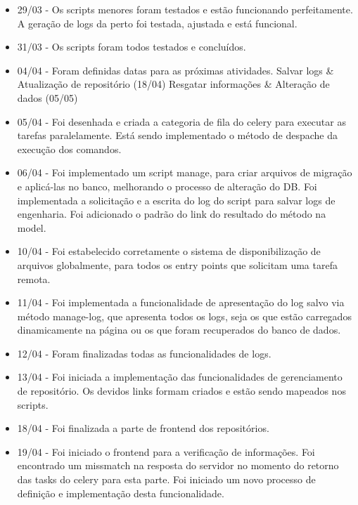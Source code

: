 \begin{itemize}
    \item 29/03 -
Os scripts menores foram testados e estão funcionando perfeitamente. A geração de logs da perto foi testada, ajustada e está funcional.


    \item 31/03 -
Os scripts foram todos testados e concluídos.


    \item 04/04 -
Foram definidas datas para as próximas atividades.
Salvar logs \& Atualização de repositório (18/04)
Resgatar informações \& Alteração de dados (05/05)


    \item 05/04 -
Foi desenhada e criada a categoria de fila do celery para executar as tarefas paralelamente. Está sendo implementado o método de despache da execução dos comandos.


    \item 06/04 -
Foi implementado um script manage, para criar arquivos de migração e aplicá-las no banco, melhorando o processo de alteração do DB.
Foi implementada a solicitação e a escrita do log do script para salvar logs de engenharia.
Foi adicionado o padrão do link do resultado do método na model.


    \item 10/04 -
Foi estabelecido corretamente o sistema de disponibilização de arquivos globalmente, para todos os entry points que solicitam uma tarefa remota.


    \item 11/04 -
Foi implementada a funcionalidade de apresentação do log salvo via método manage-log, que apresenta todos os logs, seja os que estão carregados dinamicamente na página ou os que foram recuperados do banco de dados.


    \item 12/04 -
Foram finalizadas todas as funcionalidades de logs.


    \item 13/04 -
Foi iniciada a implementação das funcionalidades de gerenciamento de repositório. Os devidos links formam criados e estão sendo mapeados nos scripts.


    \item 18/04 -
Foi finalizada a parte de frontend dos repositórios.


    \item 19/04 -
Foi iniciado o frontend para a verificação de informações. Foi encontrado um missmatch na resposta do servidor no momento do retorno das tasks do celery para esta parte. Foi iniciado um novo processo de definição e implementação desta funcionalidade.



\end{itemize}
